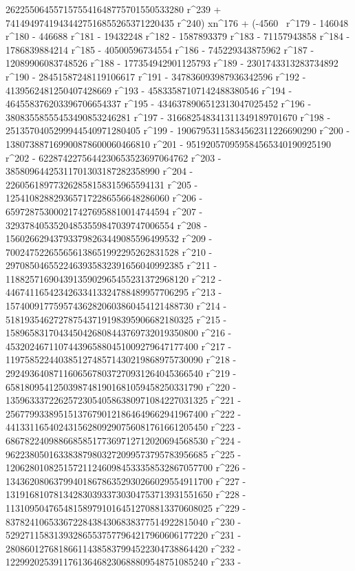        2622550645571575541648775701550533280 r^239 + 
       74149497419434427516855265371220435 r^240) xn^176 + (-4560 \
r^179 - 146048 r^180 - 446688 r^181 - 19432248 r^182 - 
       1587893379 r^183 - 71157943858 r^184 - 1786839884214 r^185 - 
       40500596734554 r^186 - 745229343875962 r^187 - 
       12089906083748526 r^188 - 177354942901125793 r^189 - 
       2301743313283734892 r^190 - 28451587248119106617 r^191 - 
       347836093987936342596 r^192 - 4139562481250407428669 r^193 - 
       45833587107142488380546 r^194 - 
       464558376203396706654337 r^195 - 
       4346378906512313047025452 r^196 - 
       38083558555453490853246281 r^197 - 
       316682548341311349189701670 r^198 - 
       2513570405299944540971280405 r^199 - 
       19067953115834562311226690290 r^200 - 
       138073887169900878600060466810 r^201 - 
       951920570959584565340190925190 r^202 - 
       6228742275644230653523697064762 r^203 - 
       38580964425311701303187282358990 r^204 - 
       226056189773262858158315965594131 r^205 - 
       1254108288293657172286556648286060 r^206 - 
       6597287530002174276958810014744594 r^207 - 
       32937840535204853559847039747006554 r^208 - 
       156026629437933798263449085596499532 r^209 - 
       700247522655656138651992295262831528 r^210 - 
       2970850465522463935832391656040992385 r^211 - 
       11882571690439135902965455231372968120 r^212 - 
       44674116542342633413324788489957706295 r^213 - 
       157400917759574362820603860454121488730 r^214 - 
       518193546272787543719198395906682180325 r^215 - 
       1589658317043450426808443769732019350800 r^216 - 
       4532024671107443965880451009279647177400 r^217 - 
       11975852244038512748571430219868975730090 r^218 - 
       29249364087116065678037270931264045366540 r^219 - 
       65818095412503987481901681059458250331790 r^220 - 
       135963337226257230540586380971084227031325 r^221 - 
       256779933895151376790121864649662941967400 r^222 - 
       441331165402431562809290756081761661205450 r^223 - 
       686782240988668585177369712712020694568530 r^224 - 
       962238050163383879803272099573795783956685 r^225 - 
       1206280108251572112460984533358532867057700 r^226 - 
       1343620806379940186786352930266029554911700 r^227 - 
       1319168107813428303933730304753713931551650 r^228 - 
       1131095047654815897910164512708813370608025 r^229 - 
       837824106533672284384306838377514922815040 r^230 - 
       529271158313932865537577964217960606177220 r^231 - 
       280860127681866114385837994522304738864420 r^232 - 
       122992025391176136468230688809548751085240 r^233 - 
